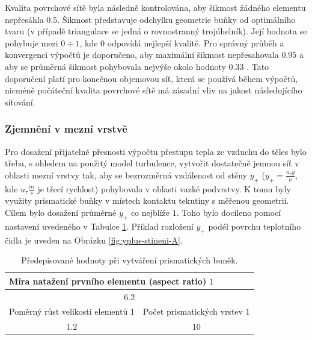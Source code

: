             Kvalita povrchové sítě byla následně kontrolována, aby šikmost žádného elementu nepřesáhla $0.5$. Šikmost představuje odchylku geometrie buňky od optimálního tvaru (v případě triangulace se jedná o rovnostranný trojúhelník). Její hodnota se pohybuje mezi $0 \div 1$, kde $0$ odpovídá nejlepší kvalitě. Pro správný průběh a konvergenci výpočtů je doporučeno, aby maximální šikmost nepřesahovala $0.95$ a aby se průměrná šikmost pohybovala nejvýše okolo hodnoty $0.33$ \cite{Ansys2020User}. Tato doporučení platí pro konečnou objemovou síť, která se používá během výpočtů, nicméně počáteční kvalita povrchové sítě má zásadní vliv na jakost následujícího síťování.
        \subsubsection{Zjemnění v mezní vrstvě}
            Pro dosažení přijatelné přesnosti výpočtu přestupu tepla ze vzduchu do těles bylo třeba, s ohledem na použitý model turbulence, vytvořit dostatečně jemnou síť v oblasti mezní vrstvy tak, aby se bezrozměrná vzdálenost od stěny $y _+$ ($y _+ = \frac{u _\tau y}{\nu}$, kde $u _\tau \unit{\frac{m}{s}}$ je třecí rychlost) pohybovala v oblasti vazké podvrstvy. K tomu byly využity prismatické buňky v místech kontaktu tekutiny s měřenou geometrií. Cílem bylo dosažení průměrné $y_+$ co nejblíže $1$. Toho bylo docíleno pomocí nastavení uvedeného v Tabulce \ref{tab:mezni-vrstva-nastaveni}. Příklad rozložení $y_+$ podél povrchu teplotního čidla je uveden na Obrázku \ref{fig:yplus-stineni-A}.

            \begin{table}[ht!]
                \centering
                \begin{tabular}{ll}
                    \multicolumn{2}{l}{Míra natažení prvního elementu (aspect ratio) $\unit{1}$}                            \\ \hline
                    \multicolumn{2}{c}{$6.2$}                                                                        \\ \hline
                    \multicolumn{1}{l|}{Poměrný růst velikosti elementů $\unit{1}$} & Počet prismatických vrstev $\unit{1}$ \\ \hline
                    \multicolumn{1}{c|}{$1.2$}                                      & \multicolumn{1}{c}{$10$}                
                \end{tabular}
                \caption{Předepisované hodnoty při vytváření prismatických buněk.}
                \label{tab:mezni-vrstva-nastaveni}
            \end{table}

